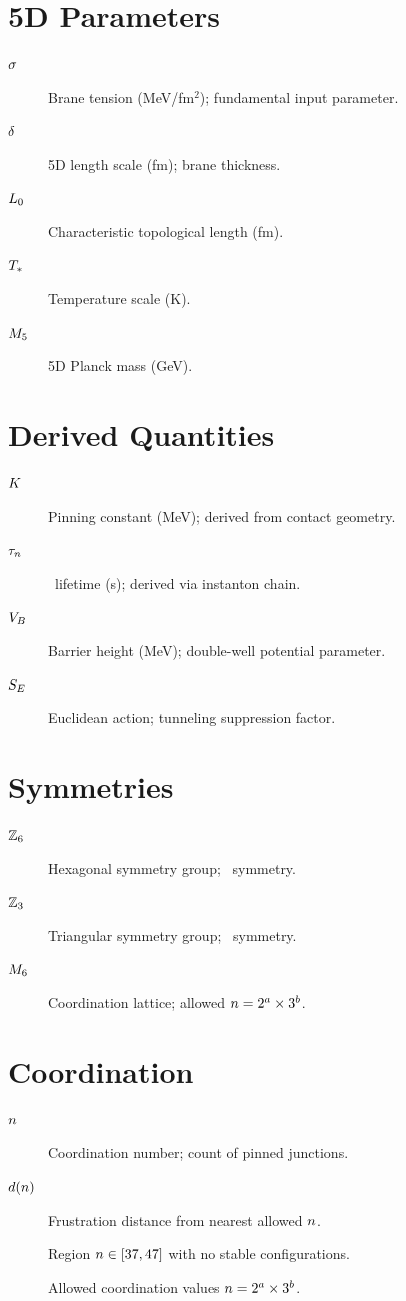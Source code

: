 \documentclass[11pt,a4paper,twoside,openright]{book}
\begin{document}

\section*{5D Parameters}
\begin{description}
    \item[$\sigma$] Brane tension (MeV/fm$^2$); fundamental input parameter.
    \item[$\delta$] 5D length scale (fm); brane thickness.
    \item[$L_0$] Characteristic topological length (fm).
    \item[$T_*$] Temperature scale (K).
    \item[$M_5$] 5D Planck mass (GeV).
\end{description}


\section*{Derived Quantities}
\begin{description}
    \item[$K$] Pinning constant (MeV); derived from contact geometry.
    \item[$\tau_n$] \MetastableJunction\ lifetime (s); derived via instanton chain.
    \item[$V_B$] Barrier height (MeV); double-well potential parameter.
    \item[$S_E$] Euclidean action; tunneling suppression factor.
\end{description}


\section*{Symmetries}
\begin{description}
    \item[$\mathbb{Z}_6$] Hexagonal symmetry group; \AnchorJunction\ symmetry.
    \item[$\mathbb{Z}_3$] Triangular symmetry group; \MetastableJunction\ symmetry.
    \item[$M_6$] Coordination lattice; allowed $n = 2^a \times 3^b$.
\end{description}


\section*{Coordination}
\begin{description}
    \item[$n$] Coordination number; count of pinned junctions.
    \item[$d(n)$] Frustration distance from nearest allowed $n$.
    \item[\ForbiddenZone] Region $n \in [37, 47]$ with no stable configurations.
    \item[\StableCoord] Allowed coordination values $n = 2^a \times 3^b$.
\end{description}


\end{document}
